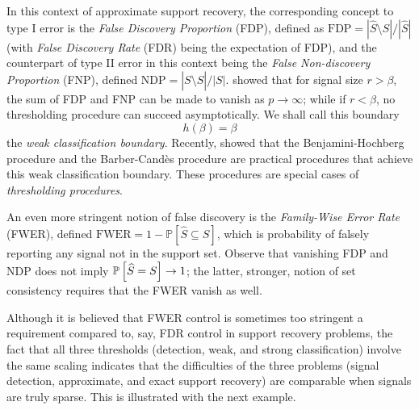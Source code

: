 In this context of approximate support recovery, the corresponding concept to type I error is the \emph{False Discovery Proportion} (FDP), defined as $\text{FDP} = |\widehat{S}\setminus S|\big/|\widehat{S}|$ (with \emph{False Discovery Rate} (FDR) being the expectation of FDP), 
and the counterpart of type II error in this context being the \emph{False Non-discovery Proportion} (FNP), defined $\text{NDP} = |S\setminus\widehat{S}|\big/|S|$.
\citet*{haupt2011distilled} showed that for signal size $r > \beta$, the sum of FDP and FNP can be made to vanish as $p\to\infty$; while if $r < \beta$, no thresholding procedure can succeed asymptotically. We shall call this boundary 
\begin{equation} \label{eq:weak-classification-boundary}
    h(\beta) = \beta
\end{equation}
the \emph{weak classification boundary}. Recently, \citet*{arias2017distribution} showed that the Benjamini-Hochberg procedure \citep*{benjamini1995controlling} and the Barber-Cand{\`e}s procedure \citep*{barber2015controlling} are practical procedures that achieve this weak classification boundary.
These procedures are special cases of \emph{thresholding procedures}.

An even more stringent notion of false discovery is the \emph{Family-Wise Error Rate} (FWER), defined $\text{FWER} = 1 - \mathbb P[\widehat{S} \subseteq S]$, which is probability of falsely reporting any signal not in the support set.
Observe that vanishing FDP and NDP does not imply $\P\left[\widehat{S} = S\right]\to 1$;
the latter, stronger, notion of set consistency requires that the FWER vanish as well.

\begin{remark} \label{rmk:gap-when-signal-sparse}
Although it is believed that FWER control is sometimes too stringent a requirement compared to, say, FDR control in support recovery problems, 
the fact that all three thresholds (detection, weak, and strong classification) involve the same scaling indicates that the difficulties of the three problems (signal detection, approximate, and exact support recovery) are comparable when signals are truly sparse.
This is illustrated with the next example.
\end{remark}

